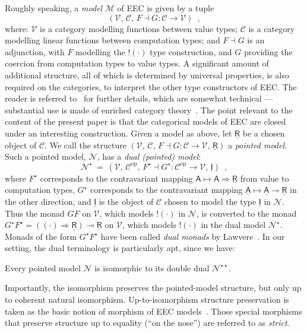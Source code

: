 \documentclass{LMCS}
\newcommand{\comptype}[1]{\underline{#1}}
\newcommand{\VA}{\mathsf{A}}
\newcommand{\CA}{\comptype{\mathsf{A}}}
\newcommand{\CR}{\comptype{\mathsf{R}}}
\newcommand{\CI}{\comptype{\mathsf{I}}}
\newcommand{\lpop}{\multimap}
\newcommand{\Cfun}{\Rightarrow}
\newcommand{\Cbang}[1]{{! #1}}
\begin{document}
Roughly speaking, a \emph{model} $\mathcal{M}$ of EEC
is given by a tuple 
\[(\mathcal{V}, \, \mathcal{C}, \, F \dashv G \colon \mathcal{C} \to \mathcal{V}) \enspace ,\]
where: $\mathcal{V}$ is a category modelling functions between value types;
$\mathcal{C}$ is a category modelling linear functions between computation types;
and $F \dashv G$ is an adjunction, with $F$  modelling the $\Cbang{(\cdot)}$ type construction,
and $G$ providing the coercion from computation types to value types.
A significant amount of 
additional structure,
all of which is determined by universal properties,
is also required on the categories, to interpret the other type constructors of EEC.
The reader is referred to~\cite{EMS,EMSb,EMSc} for further details,
which are somewhat technical --- substantial use is made of 
{enriched category theory}~\cite{Kelly:book}.
The point relevant to the content of the present paper is that 
the categorical models of EEC are closed under an interesting construction.
Given a model as above, let $\CR$ be a chosen object of $\mathcal{C}$.
We call the structure 
$(\mathcal{V}, \, \mathcal{C},\,  F \dashv G \colon \mathcal{C} \to \mathcal{V}, \, \CR)$ a
\emph{pointed model}. 
Such a pointed model, $\mathcal{N}$, has a \emph{dual (pointed) model}:
\[
\mathcal{N}^{\star} \: = \: 
(\mathcal{V}, \,\mathcal{C}^{\mathrm{op}}, \,
  F^{\star} \dashv G^{\star} \colon \mathcal{C}^{\mathrm{op}} \to \mathcal{V},\, \CI) \enspace ,
\]
where $F^{\star}$ corresponds to the contravariant mapping $\VA \mapsto \VA \Cfun \CR$ from value to computation types,
$G^{\star}$ 
corresponds to the contravariant mapping $\CA \mapsto \CA \lpop \CR$ in the other direction,
and $\CI$ is the object of $\mathcal{C}$ chosen to model the type $\CI$ in $\mathcal{N}$.
Thus the monad $GF$ on $\mathcal{V}$, which models $\Cbang{(\cdot)}$ in $\mathcal{N}$,
is converted to the monad $G^{\star}F^{\star} = ((\cdot) \Cfun \CR) \lpop \CR$ on 
$\mathcal{V}$, which models $\Cbang{(\cdot)}$ in the dual model $\mathcal{N}^{\star}$.
Monads of the form $G^{\star}F^{\star}$ have been called \emph{dual monads} 
by Lawvere~\cite{Lawvere:doctrines}. In our setting, the dual terminology is particularly
apt, since we have:
\begin{fact}
\label{fact:double:dual}
Every pointed model $\mathcal{N}$ is isomorphic to its double dual ${\mathcal{N}^{\star\star}}$.
\end{fact}
\noindent
Importantly, the isomorphism preserves the pointed-model structure, but only up
to coherent natural isomorphism. Up-to-isomorphism structure preservation
is taken as the basic notion of morphism of EEC models~\cite{EMS,EMSc}.
Those  special morphisms that preserve structure up to equality (``on the nose'')
are referred to as \emph{strict}.
\end{document}
